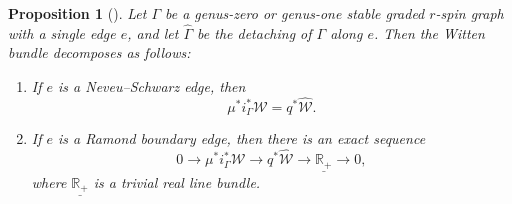 \documentclass[11pt]{amsart}
\newtheorem{pr}[dummy]{Proposition}
\theoremstyle{definition}
\theoremstyle{remark}
\newcommand{\<}{\left<}
\renewcommand{\>}{\right>}
\numberwithin{equation}{section}
\begin{document}
\begin{pr}[{\cite[Proposition 2.20]{TZ1}}]
\label{prop decomposition}
Let $\Gamma$ be a genus-zero or genus-one stable graded $r$-spin graph with a single edge $e$, and let $\widehat{\Gamma}$ be the detaching of $\Gamma$ along $e$.  Then the Witten bundle decomposes %
as follows:
\begin{enumerate}
\item\label{it NS} If $e$ is a Neveu--Schwarz edge, then \begin{equation}\label{eq NSdecompses}
\mu^*i_{\Gamma}^*{\mathcal{W}} = q^*\widehat{{\mathcal{W}}}.
\end{equation}

\item\label{it decompose Ramond boundary edge} If $e$ is a Ramond boundary edge, then there is an exact sequence
\begin{equation}
\label{eq decompose}0 \to \mu^*i_{\Gamma}^*{\mathcal{W}} \to q^*\widehat{{\mathcal{W}}} \to \underline{\mathbb{R}_+} \to 0,
\end{equation}
where %
$\underline{\mathbb{R}_+}$ is a trivial real line %
bundle.


\end{enumerate}
\end{pr}
\end{document}
